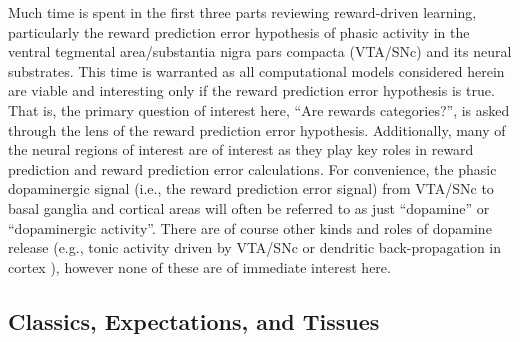 Much time is spent in the first three parts reviewing reward-driven learning, particularly the reward prediction error hypothesis of phasic activity in the ventral tegmental area/substantia nigra pars compacta (VTA/SNc) and its neural substrates.  This time is warranted as all computational models considered herein are viable and interesting only if the reward prediction error hypothesis is true.  That is, the primary question of interest here, ``Are rewards categories?'', is asked through the lens of the reward prediction error hypothesis.  Additionally, many of the neural regions of interest are of interest as they play key roles in reward prediction and reward prediction error calculations.  For convenience, the phasic dopaminergic signal (i.e., the reward prediction error signal) from VTA/SNc to basal ganglia and cortical areas will often be referred to as just ``dopamine'' or ``dopaminergic activity''.  There are of course other kinds and roles of dopamine release (e.g., tonic activity driven by VTA/SNc \cite{schultz:2007aa} or dendritic back-propagation in cortex \cite{jay:2003aa}), however none of these are of immediate interest here.

\subsection{Classics, Expectations, and Tissues} %
\label{sub:cet}
